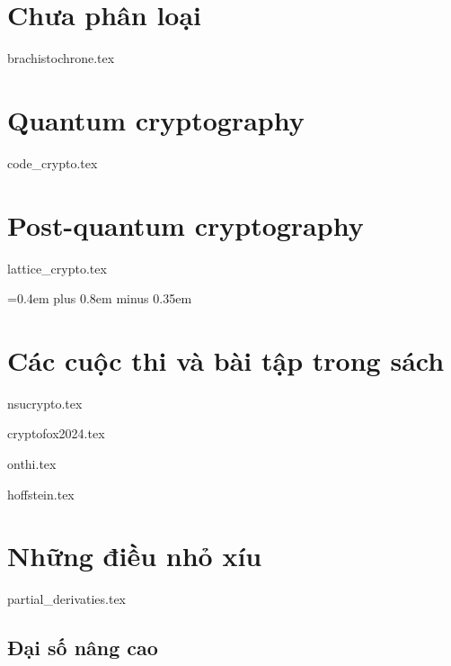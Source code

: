 \documentclass{mynotes}
\begin{document}
\part{Chưa phân loại}





{brachistochrone.tex}



\part{Quantum cryptography}

\parttoc



{code_crypto.tex}

\part{Post-quantum cryptography}

\parttoc

{lattice_crypto.tex}

{
 \spaceskip=0.4em plus 0.8em minus 0.35em
\printbibliography[env=gostbibliography,heading=bibintoc,title={Tài liệu tham khảo}]
}


\part{Các cuộc thi và bài tập trong sách}

\parttoc

{nsucrypto.tex}

{cryptofox2024.tex}

{onthi.tex}

{hoffstein.tex}

\part{Những điều nhỏ xíu}

\parttoc

{partial_derivaties.tex}

\chapter{Đại số nâng cao}
\end{document}
